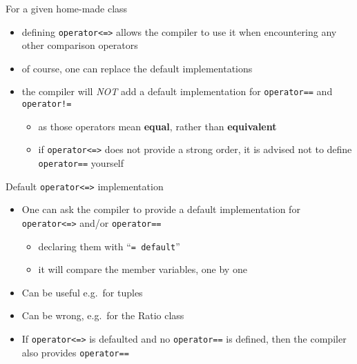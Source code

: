 \begin{frame}[fragile]
  \begin{block}{For a given home-made class}
    \begin{itemize}
    \item defining \texttt{operator<=>} allows the compiler to use it when encountering any other comparison operators
    \item of course, one can replace the default implementations
    \item the compiler will \emph{NOT} add a default implementation for \texttt{operator==} and \texttt{operator!=}
      \begin{itemize}
      \item as those operators mean \textbf{equal}, rather than \textbf{equivalent}
      \item if \texttt{operator<=>} does not provide a strong order, it is advised not to define \texttt{operator==} yourself
      \end{itemize}
    \end{itemize}
  \end{block}
\end{frame}

\begin{frame}[fragile]
  \begin{block}{Default \texttt{operator<=>} implementation}
    \begin{itemize}
    \item One can ask the compiler to provide a default implementation for \texttt{operator<=>} and/or \texttt{operator==}
      \begin{itemize}
        \item declaring them with ``\texttt{= default}''
        \item it will compare the member variables, one by one
      \end{itemize}
    \item Can be useful e.g.\ for tuples
    \item Can be wrong, e.g.\ for the Ratio class
    \item If \texttt{operator<=>} is defaulted and no \texttt{operator==} is defined, then the compiler also provides \texttt{operator==}
    \end{itemize}
  \end{block}
\end{frame}

